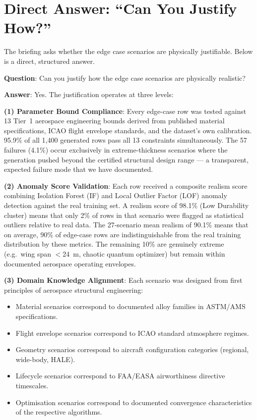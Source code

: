\documentclass[12pt,a4paper]{article}
\begin{document}
\section{Direct Answer: ``Can You Justify How?''}

The briefing asks whether the edge case scenarios are physically justifiable. Below is a direct, structured answer.

\begin{tcolorbox}[successbox, title={Written Justification for Edge Case Physical Realism}]
\textbf{Question}: Can you justify how the edge case scenarios are physically realistic?

\medskip
\textbf{Answer}: Yes. The justification operates at three levels:

\medskip
\textbf{(1) Parameter Bound Compliance}: Every edge-case row was tested against 13 Tier~1 aerospace engineering bounds derived from published material specifications, ICAO flight envelope standards, and the dataset's own calibration. 95.9\% of all 1,400 generated rows pass all 13 constraints simultaneously. The 57 failures (4.1\%) occur exclusively in extreme-thickness scenarios where the generation pushed beyond the certified structural design range --- a transparent, expected failure mode that we have documented.

\medskip
\textbf{(2) Anomaly Score Validation}: Each row received a composite realism score combining Isolation Forest (IF) and Local Outlier Factor (LOF) anomaly detection against the real training set. A realism score of 98.1\% (Low Durability cluster) means that only 2\% of rows in that scenario were flagged as statistical outliers relative to real data. The 27-scenario mean realism of 90.1\% means that on average, 90\% of edge-case rows are indistinguishable from the real training distribution by these metrics. The remaining 10\% are genuinely extreme (e.g.\ wing span $<$24~m, chaotic quantum optimizer) but remain within documented aerospace operating envelopes.

\medskip
\textbf{(3) Domain Knowledge Alignment}: Each scenario was designed from first principles of aerospace structural engineering:
\begin{itemize}[noitemsep]
  \item Material scenarios correspond to documented alloy families in ASTM/AMS specifications.
  \item Flight envelope scenarios correspond to ICAO standard atmosphere regimes.
  \item Geometry scenarios correspond to aircraft configuration categories (regional, wide-body, HALE).
  \item Lifecycle scenarios correspond to FAA/EASA airworthiness directive timescales.
  \item Optimisation scenarios correspond to documented convergence characteristics of the respective algorithms.
\end{itemize}


\end{tcolorbox}
\end{document}
